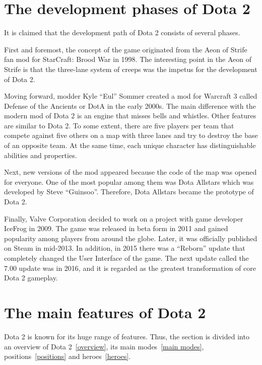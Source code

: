 \documentclass[12pt,twoside,english,a4paper]{article}
\begin{document}
\section{The development phases of Dota 2} \label{The development phases of Dota 2}
It is claimed that the development path of Dota 2 consists of several phases.

First and foremost, the concept of the game originated from the Aeon of Strife fan mod for StarCraft: Brood War in 1998\cite{Stubbs:Rise}. The interesting point in the Aeon of Strife is that the three-lane system of creeps was the impetus for the development of Dota 2. 

Moving forward, modder Kyle “Eul” Sommer created a mod for Warcraft 3 called Defense of the Ancients or DotA in the early 2000s. The main difference with the modern mod of Dota 2 is an engine that misses bells and whistles. Other features are similar to Dota 2. To some extent, there are five players per team that compete against five others on a map with three lanes and try to destroy the base of an opposite team. At the same time, each unique character has distinguishable abilities and properties. 

Next, new versions of the mod appeared because the code of the map was opened for everyone. One of the most popular among them was Dota Allstars\cite{Pra:What} which was developed by Steve “Guinsoo”. Therefore, Dota Allstars became the prototype of Dota 2.

Finally, Valve Corporation decided to work on a project with game developer IceFrog in 2009. The game was released in beta form in 2011 and gained popularity among players from around the globe. Later, it was officially published on Steam in mid-2013. In addition, in 2015 there was a “Reborn” update that completely changed the User Interface of the game. The next update called the 7.00 update was in 2016, and it is regarded as the greatest transformation of core Dota 2 gameplay.




\section{The main features of Dota 2} \label{The main features of Dota 2}


Dota 2 is known for its huge range of features. Thus, the section is divided into an overview of Dota 2~\ref{overview}, its main modes~\ref{main modes}, positions~\ref{positions} and heroes~\ref{heroes}. 
\end{document}
